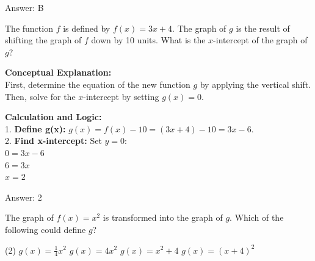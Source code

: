 \documentclass[11pt,paper=a4,answers]{exam}
\begin{document}
\begin{questions}
\begin{solution}
\vspace{25pt}

Answer: \colorbox{yellow!100}{B}
\end{solution}

\vspace{40pt}

\question
The function $f$ is defined by $f(x) = 3x + 4$. The graph of $g$ is the result of shifting the graph of $f$ down by 10 units. What is the $x$-intercept of the graph of $g$?

\begin{solution}
\textbf{Conceptual Explanation:} \\
First, determine the equation of the new function $g$ by applying the vertical shift. Then, solve for the $x$-intercept by setting $g(x) = 0$.

\vspace{20pt}

\textbf{Calculation and Logic:} \\
1. \textbf{Define g(x):} $g(x) = f(x) - 10 = (3x + 4) - 10 = 3x - 6$. \\
2. \textbf{Find x-intercept:} Set $y = 0$: \\
$0 = 3x - 6$ \\
$6 = 3x$ \\
$x = 2$

\vspace{25pt}

Answer: \colorbox{yellow!100}{2}
\end{solution}

\vspace{40pt}

\question
\begin{center}
\end{center}
The graph of $f(x) = x^2$ is transformed into the graph of $g$. Which of the following could define $g$?
\begin{tasks}(2)
    \task $g(x) = \frac{1}{4}x^2$
    \task $g(x) = 4x^2$
    \task $g(x) = x^2 + 4$
    \task $g(x) = (x+4)^2$
\end{tasks}


\end{questions}
\end{document}
